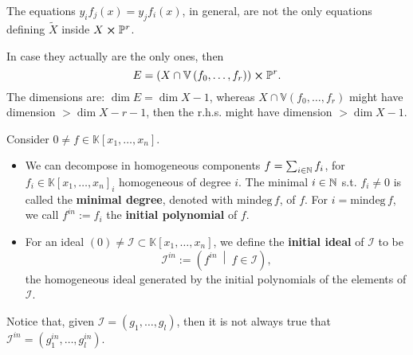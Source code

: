 \begin{rem}[]
	The equations $y_i f_j(x) = y_j f_i(x)$, in general, are not the only
	equations defining $\widetilde{X}$ inside $X \cross \mathbb{P}^{r}$.

	In case they actually are the only ones, then
	\begin{equation}
		E = \left( X \cap \mathbb{V}\left( f_0, \ldots, f_r \right) \right) \cross \mathbb{P}^{r}
	.\end{equation} 
	The dimensions are: $\dim E = \dim X -1$, whereas $X \cap \mathbb{V}\left( f_0, \ldots, f_r \right)$ might have
	dimension $> \dim X - r -1$, then the r.h.s. might have dimension $> \dim X -1$.
\end{rem}

\begin{defn}
	Consider $0 \neq f \in \mathbb{K}\left[x_1, \ldots, x_n \right]$.
	\begin{itemize}
		\item We can decompose in homogeneous components $f = \sum_{i \in \mathbb{N}}^{} f_i$,
			for $f_i \in \mathbb{K}\left[x_1, \ldots, x_n \right]_i$
			homogeneous of degree $i$.
			The minimal $i \in \mathbb{N}$ s.t. $f_i \neq 0$ is called the \textbf{minimal degree},
			denoted with $\mathrm{mindeg}\, f$, of $f$.
			For $i = \mathrm{mindeg}\, f$, we call $f^{in}:= f_i$ the \textbf{initial polynomial}
			of $f$.
		\item For an ideal $(0) \neq \mathcal{I} \subset \mathbb{K}\left[x_1, \ldots, x_n \right]$,
			we define the \textbf{initial ideal} of $\mathcal{I}$ to be
			\begin{equation}
			\mathcal{I}^{in} :=
			\left( f^{in} \ \middle|\ f \in \mathcal{I} \right)
			,\end{equation} 
			the homogeneous ideal generated by the initial polynomials of the elements of $\mathcal{I}$.
	\end{itemize}
\end{defn}

\begin{rem}[]
	Notice that, given $\mathcal{I} = \left( g_1, \ldots, g_l \right)$, then it is not always
	true that $\mathcal{I}^{in} = \left( g_1^{in}, \ldots, g_l^{in} \right)$.
\end{rem}

